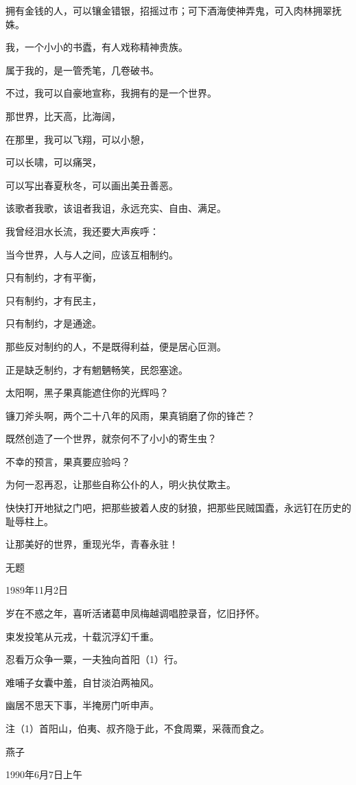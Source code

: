 \documentclass[../../dazhuan.tex]{subfiles}
\begin{document}
拥有金钱的人，可以镶金错银，招摇过市；可下酒海使神弄鬼，可入肉林拥翠抚姝。

我，一个小小的书蠹，有人戏称精神贵族。

属于我的，是一管秃笔，几卷破书。

不过，我可以自豪地宣称，我拥有的是一个世界。

那世界，比天高，比海阔，

在那里，我可以飞翔，可以小憩，

可以长啸，可以痛哭，

可以写出春夏秋冬，可以画出美丑善恶。

该歌者我歌，该诅者我诅，永远充实、自由、满足。

我曾经泪水长流，我还要大声疾呼：

当今世界，人与人之间，应该互相制约。

只有制约，才有平衡，

只有制约，才有民主，

只有制约，才是通途。

那些反对制约的人，不是既得利益，便是居心叵测。

正是缺乏制约，才有魍魉畅笑，民怨塞途。

太阳啊，黑子果真能遮住你的光辉吗？

镰刀斧头啊，两个二十八年的风雨，果真销磨了你的锋芒？

既然创造了一个世界，就奈何不了小小的寄生虫？

不幸的预言，果真要应验吗？

为何一忍再忍，让那些自称公仆的人，明火执仗欺主。

快快打开地狱之门吧，把那些披着人皮的豺狼，把那些民贼国蠹，永远钉在历史的耻辱柱上。

让那美好的世界，重现光华，青春永驻！



无题

1989年11月2日

岁在不惑之年，喜听活诸葛申凤梅越调唱腔录音，忆旧抒怀。

束发投笔从元戎，十载沉浮幻千重。

忍看万众争一粟，一夫独向首阳（1）行。

难哺子女囊中羞，自甘淡泊两袖风。

幽居不思天下事，半掩房门听申声。

注（1）首阳山，伯夷、叔齐隐于此，不食周粟，采薇而食之。



燕子

1990年6月7日上午
\end{document}
